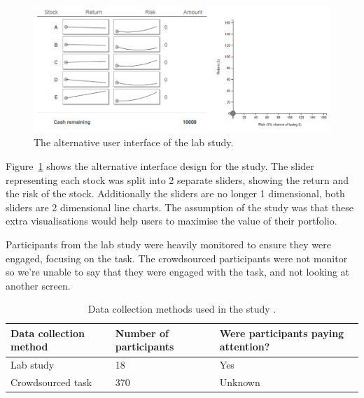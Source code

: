 \documentclass{article}
\begin{document}
\begin{figure}[ht]
    \centering
    \includegraphics[scale=0.45, frame]{Images/interfaceSA.png}
    \caption{The alternative user interface of the lab study.}
    \label{fig:interfaceSA}
\end{figure}

Figure~\ref{fig:interfaceSA} shows the alternative interface design for the study.
The slider representing each stock was split into 2 separate sliders, showing the return and the risk of the stock.
Additionally the sliders are no longer 1 dimensional, both sliders are 2 dimensional line charts.
The assumption of the study was that these extra visualisations would help users to maximise the value of their portfolio.

Participants from the lab study were heavily monitored to ensure they were engaged, focusing on the task.
The crowdsourced participants were not monitor so we're unable to say that they were engaged with the task, and not looking at another screen. 

\begin{table}[ht]
    \caption{\label{table:studies} Data collection methods used in the study \cite{torsney2018risk}.}
    \small
    \begin{tabular}{lll}
        \hline
        Data collection method & Number of participants & Were participants paying attention? \\    \hline
        Lab study              & 18                     & Yes                                 \\
        Crowdsourced task      & 370                    & Unknown                             \\    \hline
    \end{tabular}
\end{table}
\end{document}
